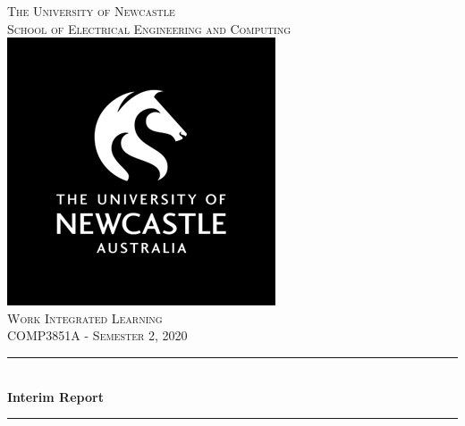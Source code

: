 \documentclass[12pt]{article}
\begin{document}
\begin{titlepage}

\newcommand{\HRule}{\rule{\linewidth}{0.5mm}} %

\center %
 

\textsc{\LARGE The University of Newcastle}\\[0.5cm]
\textsc{\large School of Electrical Engineering and Computing}\\[1.0cm] %
\includegraphics[scale=.3]{uon-logo-square.png}\\[1cm] %
\textsc{\LARGE Work Integrated Learning}\\[0.5cm] %
\textsc{\large COMP3851A - Semester 2, 2020}\\[0.5cm] %


\HRule \\[0.4cm]
{ \huge \bfseries Interim Report}\\[0.4cm] %
\HRule \\[1.5cm]
 


\end{titlepage}
\end{document}
